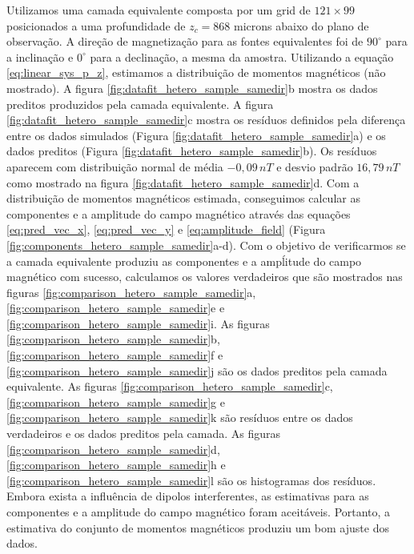 Utilizamos uma camada equivalente composta por um grid de $121 \times 99$ posicionados a uma profundidade de $z_c = 868$ microns abaixo do plano de observação. A direção de magnetização para as fontes equivalentes foi de $90^\circ$ para a inclinação e $0^\circ$ para a declinação, a mesma da amostra. 
Utilizando a equação \ref{eq:linear_sys_p_z}, estimamos a distribuição de momentos magnéticos (não mostrado). A figura \ref{fig:datafit_hetero_sample_samedir}b mostra os dados preditos produzidos pela camada equivalente. A figura \ref{fig:datafit_hetero_sample_samedir}c mostra os resíduos definidos pela diferença entre os dados simulados (Figura \ref{fig:datafit_hetero_sample_samedir}a) e os dados preditos (Figura \ref{fig:datafit_hetero_sample_samedir}b). Os resíduos aparecem com distribuição normal de média $-0,09 \, nT$ e desvio padrão $16,79 \, nT$ como mostrado na figura \ref{fig:datafit_hetero_sample_samedir}d. Com a distribuição de momentos magnéticos estimada, conseguimos calcular as componentes e a amplitude do campo magnético através das equações \ref{eq:pred_vec_x}, \ref{eq:pred_vec_y} e \ref{eq:amplitude_field} (Figura \ref{fig:components_hetero_sample_samedir}a-d). Com o objetivo de verificarmos se a camada equivalente produziu as componentes e a ampĺitude do campo magnético com sucesso, calculamos os valores verdadeiros que são mostrados nas  figuras \ref{fig:comparison_hetero_sample_samedir}a, \ref{fig:comparison_hetero_sample_samedir}e e \ref{fig:comparison_hetero_sample_samedir}i. As figuras \ref{fig:comparison_hetero_sample_samedir}b, \ref{fig:comparison_hetero_sample_samedir}f e \ref{fig:comparison_hetero_sample_samedir}j são os dados preditos pela camada equivalente. As figuras \ref{fig:comparison_hetero_sample_samedir}c, \ref{fig:comparison_hetero_sample_samedir}g e \ref{fig:comparison_hetero_sample_samedir}k são resíduos entre os dados verdadeiros e os dados preditos pela camada. As figuras \ref{fig:comparison_hetero_sample_samedir}d, \ref{fig:comparison_hetero_sample_samedir}h e \ref{fig:comparison_hetero_sample_samedir}l são os histogramas dos resíduos. Embora exista a influência de dipolos interferentes, as estimativas para as componentes e a amplitude do campo magnético foram aceitáveis. Portanto, a estimativa do conjunto de momentos magnéticos produziu um bom ajuste dos dados.   


